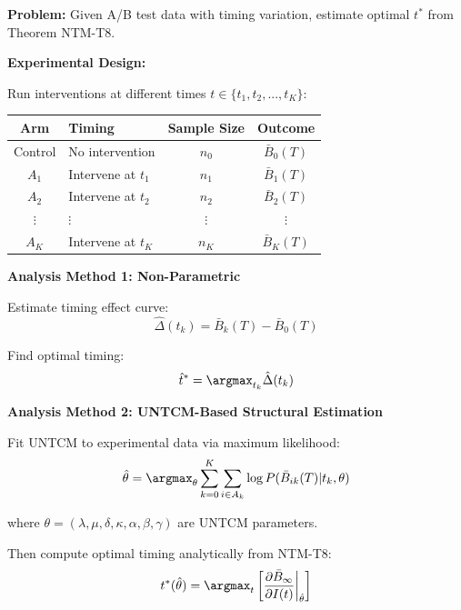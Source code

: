 \begin{tcolorbox}[colback=purple!5!white, colframe=purple!75!black,
    title=\textbf{Application UNTCM-E3: Optimal Intervention Timing from A/B Tests}]

\textbf{Problem:} Given A/B test data with timing variation, estimate optimal $t^*$ from Theorem NTM-T8.

\textbf{Experimental Design:}

Run interventions at different times $t \in \{t_1, t_2, ..., t_K\}$:
\begin{center}
\renewcommand{\arraystretch}{1.2}
\begin{tabular}{@{}clcc@{}}
\toprule
\textbf{Arm} & \textbf{Timing} & \textbf{Sample Size} & \textbf{Outcome} \\
\midrule
Control & No intervention & $n_0$ & $\bar{B}_0(T)$ \\
$A_1$ & Intervene at $t_1$ & $n_1$ & $\bar{B}_1(T)$ \\
$A_2$ & Intervene at $t_2$ & $n_2$ & $\bar{B}_2(T)$ \\
$\vdots$ & $\vdots$ & $\vdots$ & $\vdots$ \\
$A_K$ & Intervene at $t_K$ & $n_K$ & $\bar{B}_K(T)$ \\
\bottomrule
\end{tabular}
\end{center}

\textbf{Analysis Method 1: Non-Parametric}

Estimate timing effect curve:
\begin{equation}
\hat{\Delta}(t_k) = \bar{B}_k(T) - \bar{B}_0(T)
\end{equation}

Find optimal timing:
\begin{equation}
\hat{t}^* = \argmax_{t_k} \hat{\Delta}(t_k)
\end{equation}

\textbf{Analysis Method 2: UNTCM-Based Structural Estimation}

Fit UNTCM to experimental data via maximum likelihood:
\begin{equation}
\hat{\theta} = \argmax_\theta \sum_{k=0}^{K} \sum_{i \in A_k} \log P(\bar{B}_{ik}(T) | t_k, \theta)
\end{equation}

where $\theta = (\lambda, \mu, \delta, \kappa, \alpha, \beta, \gamma)$ are UNTCM parameters.

Then compute optimal timing analytically from NTM-T8:
\begin{equation}
t^*(\hat{\theta}) = \argmax_t \left[ \frac{\partial \bar{B}_\infty}{\partial I(t)} \bigg|_{\hat{\theta}} \right]
\end{equation}


\end{tcolorbox}
